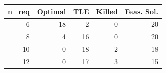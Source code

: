 
\begin{tabular}{rrrrr}
\toprule
n\_req & Optimal & TLE & Killed & Feas. Sol.\\
\midrule
6 & 18 & 2 & 0 & 20\\
8 & 4 & 16 & 0 & 20\\
10 & 0 & 18 & 2 & 18\\
12 & 0 & 17 & 3 & 15\\
\bottomrule
\end{tabular}
